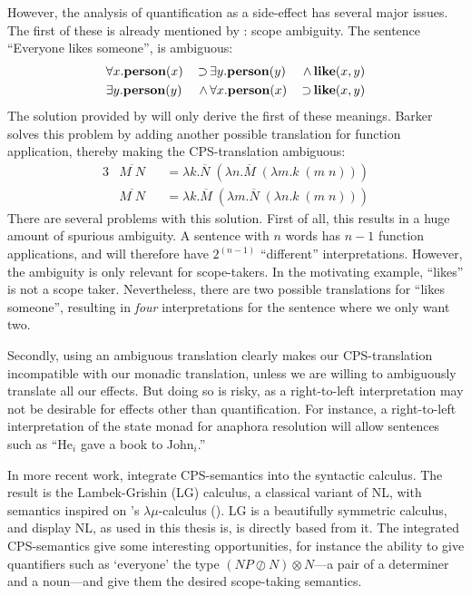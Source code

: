 However, the analysis of quantification as a side-effect has several
major issues. The first of these is already mentioned by
\citet{barker2004}: scope ambiguity. The sentence ``Everyone likes
someone'', is ambiguous:
\begin{alignat*}{3}
  &\forall x.\mathbf{person}(x) \,&\supset \,&\exists y.\mathbf{person}(y) \,&\wedge  \,&\mathbf{like}(x,y)\\
  &\exists y.\mathbf{person}(y) \,&\wedge  \,&\forall x.\mathbf{person}(x) \,&\supset \,&\mathbf{like}(x,y)
\end{alignat*}
The solution provided by \citet{barker2002,barker2004} will only
derive the first of these meanings. Barker solves this problem by
adding another possible translation for function application, thereby
making the CPS-translation ambiguous:
\begin{alignat*}{3}
  &\overline{M\;N} &&= \lambda k. \overline{N}\;(\lambda
  n.\overline{M}\;(\lambda m.k\;(m\;n)))\\
  &\overline{M\;N} &&= \lambda k. \overline{M}\;(\lambda
  m.\overline{N}\;(\lambda n.k\;(m\;n)))
\end{alignat*}
There are several problems with this solution. First of all, this
results in a huge amount of spurious ambiguity. A sentence with $n$
words has $n-1$ function applications, and will therefore have
$2^{(n-1)}$ ``different'' interpretations. However, the ambiguity is
only relevant for scope-takers. In the motivating example, ``likes''
is not a scope taker. Nevertheless, there are two possible
translations for ``likes someone'', resulting in \emph{four}
interpretations for the sentence where we only want two.

Secondly, using an ambiguous translation clearly makes our
CPS-translation incompatible with our monadic translation, unless we
are willing to ambiguously translate all our effects. But doing so is
risky, as a right-to-left interpretation may not be desirable for
effects other than quantification. For instance, a right-to-left
interpretation of the state monad for anaphora resolution will allow
sentences such as ``He$_i$ gave a book to John$_i$.''

\vspace*{1\baselineskip}

In more recent work, \citet{moortgat2012} integrate CPS-semantics into
the syntactic calculus. The result is the Lambek-Grishin (LG)
calculus, a classical variant of NL, with semantics inspired on
\citeauthor{parigot1992}'s $\lambda\mu$-calculus
(\citeyear{parigot1992}). LG is a beautifully symmetric calculus, and
display NL, as used in this thesis is, is directly based from it. The
integrated CPS-semantics give some interesting opportunities, for
instance the ability to give quantifiers such as `everyone' the type
$(NP\oslash N)\otimes N$---a pair of a determiner and a noun---and
give them the desired scope-taking semantics.

